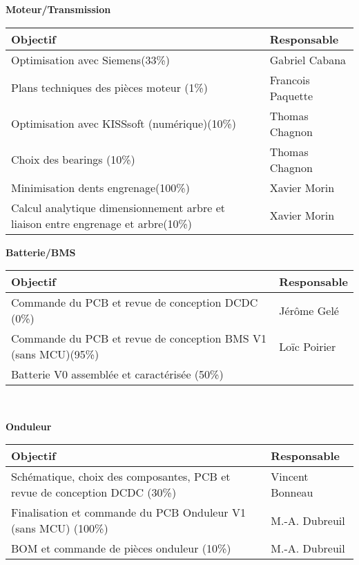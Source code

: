 \textbf{\large Moteur/Transmission}\\
\begin{tabularx}{\linewidth}{
    |>{\hsize=1.75\hsize}X|%
    >{\hsize=0.25\hsize}X|%
  }
    \hline
    \textbf{Objectif} & \textbf{Responsable} \\\hline
     Optimisation avec Siemens(33\%)  & Gabriel Cabana \\\hline
     Plans techniques des pièces moteur (1\%)  & Francois Paquette \\\hline
     Optimisation avec KISSsoft (numérique)(10\%)  &  Thomas Chagnon\\\hline
     Choix des bearings (10\%)  &  Thomas Chagnon\\\hline
     Minimisation dents engrenage(100\%) & Xavier Morin\\\hline
     Calcul analytique dimensionnement arbre et liaison entre engrenage et arbre(10\%) & Xavier Morin\\\hline
\end{tabularx}
\medskip

\textbf{\large Batterie/BMS}
\\
\begin{tabularx}{\linewidth}{
    |>{\hsize=1.75\hsize}X|%
    >{\hsize=0.25\hsize}X|%
  }
    \hline
    \textbf{Objectif} & \textbf{Responsable} \\\hline
    Commande du PCB et revue de conception DCDC (0\%)  & Jérôme Gelé \\\hline 
    Commande du PCB et revue de conception BMS V1 (sans MCU)(95\%) & Loïc Poirier\\\hline
    Batterie V0 assemblée et caractérisée (50\%)
\end{tabularx}\\
\medskip

\textbf{\large Onduleur}\\
\begin{tabularx}{\linewidth}{
    |>{\hsize=1.75\hsize}X|%
    >{\hsize=0.25\hsize}X|%
  }
    \hline
    \textbf{Objectif} & \textbf{Responsable} \\\hline
    Schématique, choix des composantes, PCB et revue de conception DCDC (30\%)  & Vincent Bonneau \\\hline 
    Finalisation et commande du PCB Onduleur V1 (sans MCU) (100\%) & M.-A. Dubreuil\\\hline
     BOM et commande de pièces onduleur (10\%) & M.-A. Dubreuil\\\hline
\end{tabularx}
\medskip

